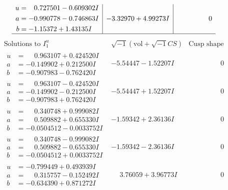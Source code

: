 \documentclass[1p]{elsarticle_modified}
\theoremstyle{definition}
\newcommand{\I}{\sqrt{-1}}
\begin{document}
$$\begin{array}{c|c|c}
\begin{aligned}
u &= \phantom{-}0.727501 - 0.609302 I \\
a &= -0.990778 - 0.746863 I \\
b &= -1.15372 + 1.43135 I\end{aligned}
 & -3.32970 + 4.99273 I & \phantom{-0.000000 } 0\\
 \hline 
 \end{array}$$\newpage$$\begin{array}{c|c|c}  
\text{Solutions to }I^u_{1}& \I (\text{vol} + \sqrt{-1}CS) & \text{Cusp shape}\\
 \hline 
\begin{aligned}
u &= \phantom{-}0.963107 + 0.424520 I \\
a &= -0.149902 + 0.212500 I \\
b &= -0.907983 - 0.762420 I\end{aligned}
 & -5.54447 - 1.52207 I & \phantom{-0.000000 } 0 \\ \hline\begin{aligned}
u &= \phantom{-}0.963107 - 0.424520 I \\
a &= -0.149902 - 0.212500 I \\
b &= -0.907983 + 0.762420 I\end{aligned}
 & -5.54447 + 1.52207 I & \phantom{-0.000000 } 0 \\ \hline\begin{aligned}
u &= \phantom{-}0.340748 + 0.999082 I \\
a &= \phantom{-}0.509882 + 0.655330 I \\
b &= -0.0504512 - 0.0033752 I\end{aligned}
 & -1.59342 + 2.36136 I & \phantom{-0.000000 } 0 \\ \hline\begin{aligned}
u &= \phantom{-}0.340748 - 0.999082 I \\
a &= \phantom{-}0.509882 - 0.655330 I \\
b &= -0.0504512 + 0.0033752 I\end{aligned}
 & -1.59342 - 2.36136 I & \phantom{-0.000000 } 0 \\ \hline\begin{aligned}
u &= -0.799449 + 0.493939 I \\
a &= \phantom{-}0.315757 - 0.152492 I \\
b &= -0.634390 + 0.871272 I\end{aligned}
 & \phantom{-}3.76059 + 3.96773 I & \phantom{-0.000000 } 0 \\ \hline\begin{aligned}

\end{aligned}
\end{array}$$
\end{document}
